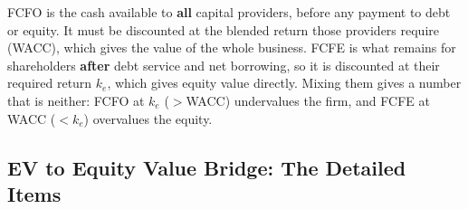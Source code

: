 \begin{addbox}
FCFO is the cash available to \textbf{all} capital providers, before any payment to debt or equity. It must be discounted at the blended return those providers require (WACC), which gives the value of the whole business. FCFE is what remains for shareholders \textbf{after} debt service and net borrowing, so it is discounted at their required return $k_e$, which gives equity value directly. Mixing them gives a number that is neither: FCFO at $k_e$ ($>$WACC) undervalues the firm, and FCFE at WACC ($<k_e$) overvalues the equity.
\end{addbox}

\subsection[EV to Equity Value Bridge: The Detailed Items]{EV to Equity Value Bridge: The Detailed Items }


